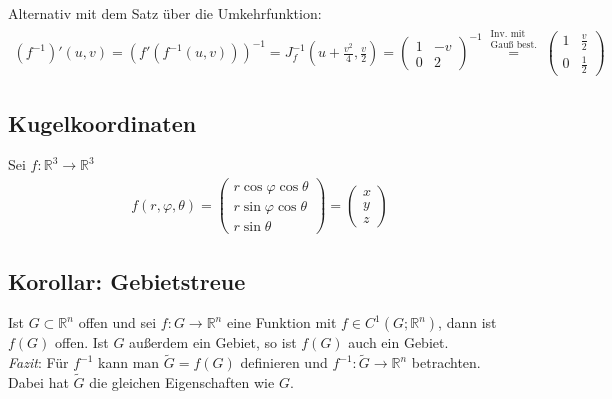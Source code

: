 \documentclass[11pt,a4paper]{book}
\newcommand {\R}	{\mathbb{R}}
\newcommand {\Rn}	{\mathbb{R}^n}
\newcommand{\1}    	{\mathbbm{1}}
\newcommand{\fum}	{f^{-1}}
\begin{document}
Alternativ mit dem Satz über die Umkehrfunktion:
\begin{align*}
	\left( f^{-1} \right)'(u,v) = \left( f'\left( f^{-1}(u,v) \right) \right)^{-1} = J_f^{-1}\left( u + \frac{v^2}{4}, \frac{v}{2} \right) = \left( \begin{array}{cc}
		1 & -v \\
		0 & 2
	\end{array} \right)^{-1}
	\stackrel{\substack{
		\textrm{Inv. mit}\\
		\textrm{Gauß best.}
	}}{=} \left( \begin{array}{cc}
		1 & \frac{v}{2} \\
		0 & \frac{1}{2}
	\end{array} \right)
\end{align*}

\subsection{Kugelkoordinaten}
Sei \(f: \R^3 \rightarrow \R^3\)
\begin{align*}
	f(r,\varphi,\theta) = \left( \begin{array}{c}
		r \cos\varphi \cos\theta \\
		r \sin\varphi \cos\theta \\
		r \sin\theta
	\end{array} \right) = \left( \begin{array}{c}
		x \\ y \\ z
	\end{array} \right)
\end{align*}

\subsection{Korollar: Gebietstreue}
Ist \(G \subset \Rn\) offen und sei \(f: G \rightarrow \Rn\) eine Funktion mit \(f \in C^1(G;\Rn)\), dann ist \(f(G)\) offen. Ist \(G\) außerdem ein Gebiet, so ist \(f(G)\) auch ein Gebiet.\\
\textit{Fazit}: Für \(\fum\) kann man \(\tilde{G} = f(G)\) definieren und \(\fum : \tilde{G} \rightarrow \Rn\) betrachten. Dabei hat \(\tilde{G}\) die gleichen Eigenschaften wie \(G\).
\end{document}
